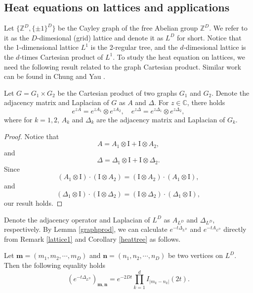 \documentclass{article}
\begin{document}
\subsection{Heat equations on lattices and applications}

Let $\{\mathbb{Z}^D, \{\pm1\}^{D} \}$ be the Cayley graph of the free Abelian group $\mathbb{Z}^D$. We refer to it as the $D$-dimesional (grid) lattice and denote it as $L^D$ for short. Notice that the 1-dimensional lattice  $L^1$ is the 2-regular tree, and the $d$-dimesional lattice is the $d$-times Cartesian product of $L^1$. To study the heat equation on lattices, we need the following result related to the graph Cartesian product. Similar work can be found in Chung and Yau \cite{CY97}.

\begin{lemma}\label{graphprod}
    Let $G=G_1 \times G_2$ be the Cartesian product of two graphs $G_1$ and $G_2$. Denote the adjacency matrix and Laplacian of $G$ as $A$ and $\Delta$. For $z\in \mathbb{C}$, there holds
\begin{equation}
    e^{zA}=e^{zA_1}\otimes e^{zA_2}, \quad e^{z\Delta}=e^{z\Delta_1}\otimes e^{z\Delta_2},
\end{equation}
where for $k=1,2$, $A_k$ and $\Delta_k$ are the adjacency matrix and Laplacian of $G_k.$
\end{lemma}
\begin{proof}
    Notice that 
    $$A=A_1 \otimes \mathrm{I}+\mathrm{I} \otimes A_2,$$
    and 
    $$\Delta=\Delta_1 \otimes \mathrm{I}+\mathrm{I} \otimes\Delta_2.$$
Since $$(A_1 \otimes \mathrm{I}) \cdot (\mathrm{I} \otimes A_2)=(\mathrm{I} \otimes A_2)\cdot(A_1 \otimes \mathrm{I}),$$
and 
$$(\Delta_1 \otimes \mathrm{I}) \cdot (\mathrm{I} \otimes \Delta_2)=(\mathrm{I} \otimes \Delta_2)\cdot(\Delta_1 \otimes \mathrm{I}),$$
our result holds.
\end{proof}

Denote the adjacency operator and Laplacian of $L^D$ as $A_{L^D}$ and $\Delta_{L^D}$, respectively. By Lemma \ref{graphprod}, we can calculate $e^{-t\Delta_{L^D}}$ and $e^{-tA_{L^D}}$ directly from Remark \ref{lattice1} and Corollary \ref{heattree} as follows.

\begin{proposition}\label{heatkerneloflattice}
    Let $\mathbf{m}=(m_1, m_2,\cdots,m_D)$ and $\mathbf{n}=(n_1, n_2,\cdots, n_D)$ be two vertices on $L^D$. Then the following equality holds
    \begin{equation}
        \left(e^{-t\Delta_{L^D}}\right)_{\mathbf{m},\mathbf{n}}=e^{-2Dt}\prod_{k=1}^{d}I_{|m_k-n_k|}(2t).
    \end{equation}
\end{proposition}
\end{document}
